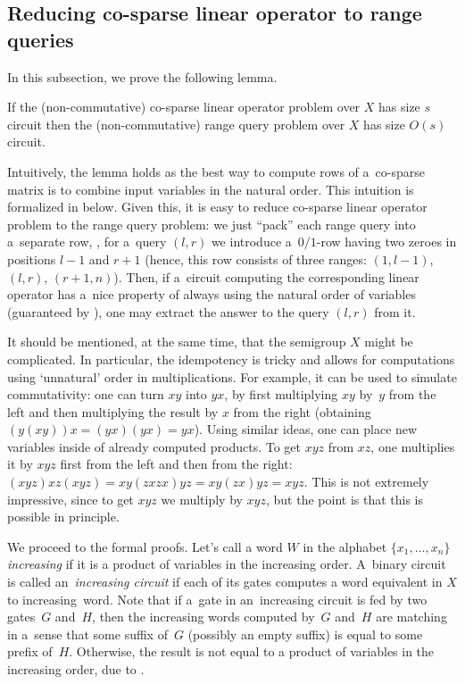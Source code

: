\subsection{Reducing
    co-sparse
    linear operator to range queries} \label{sec:operators_to_queries}
In this subsection, we prove the following lemma.

\begin{lemma} \label{lem:dense_matrices}
    If the (non-commutative)
    co-sparse
    linear operator problem over $X$ has size $s$
    circuit then the (non-commutative)
    range query
    problem over $X$ has size
    $O(s)$ circuit.
\end{lemma}

Intuitively, the lemma holds as the best way to compute rows of
%
%
a~co-sparse
matrix is to combine input variables in the natural order. This intuition is formalized in  below. Given this, it is easy to reduce
%
%
co-sparse
linear operator problem to the
%
%
range query
problem: we just ``pack'' each range query into a~separate row, \ie, for a~query $(l,r)$ we introduce a~$0/1$-row having two zeroes in positions $l-1$ and $r+1$ (hence, this row consists of three ranges: $(1,l-1)$, $(l,r)$, $(r+1,n)$). Then, if a~circuit computing the corresponding linear operator has a~nice property of always using the natural order of variables (guaranteed by ), one may extract the answer to the query $(l,r)$ from it.


It should be mentioned, at the same time, that the semigroup $X$ might be complicated.
In particular, the idempotency is tricky and allows for computations using `unnatural' order in multiplications. For example, it can be used to simulate commutativity: one can turn $xy$ into $yx$, by first multiplying $xy$ by~$y$ from the left and then multiplying the result by $x$ from the right (obtaining $(y(xy))x=(yx)(yx)=yx$). Using similar ideas, one can place new variables inside of already computed products. To get $xyz$ from $xz$, one multiplies it by $xyz$ first from the left and then from the right: $(xyz)xz(xyz)=xy(zxzx)yz=xy(zx)yz=xyz$.
This is not extremely impressive, since to get $xyz$ we multiply by $xyz$, but the point is that this is possible in principle.

We proceed to the formal proofs. Let's call a word $W$ in the alphabet $\{x_1,\ldots,x_n\}$ \emph{increasing} if it is a product of variables in the increasing order. A~binary circuit is called an~\emph{increasing circuit} if each of its gates computes a word equivalent in $X$ to increasing~word.
Note that if a~gate in an~increasing circuit is fed by two gates~$G$ and~$H$, then the increasing words computed by~$G$ and~$H$ are matching in a~sense that some suffix of~$G$ (possibly an empty suffix) is equal to some prefix of~$H$. Otherwise, the result is not equal to a product of variables in the increasing order, due to .

